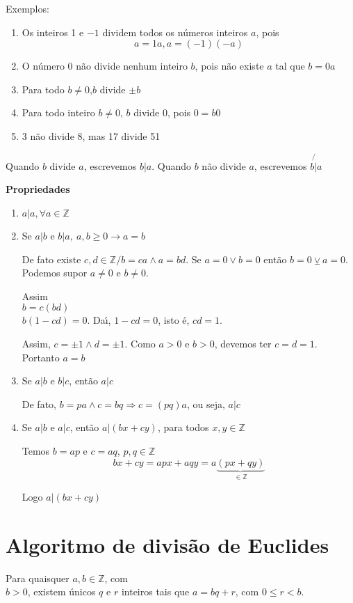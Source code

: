 Exemplos:
\begin{enumerate}
\item Os inteiros 1 e $-1$ dividem todos os n{\'u}meros inteiros $a$, pois \[a=1a,a=(-1)(-a)\]
\item O n{\'u}mero 0 n{\~a}o divide nenhum inteiro $b$, pois n{\~a}o existe $a$ tal que $b=0a$
\item Para todo $b\neq 0$,$b$ divide $\pm b$
\item Para todo inteiro $b\neq 0$, $b$ divide 0, pois $0=b0$
\item 3 n{\~a}o divide 8, mas 17 divide 51
\end{enumerate}

\begin{nota}[Divis{\~a}o] Quando $b$ divide $a$, escrevemos $b|a$. Quando $b$ n{\~a}o divide $a$, escrevemos $b\not{|}a$\end{nota}

\textbf{Propriedades}
\begin{enumerate}
\item $a|a, \forall a\in\mathbb{Z}$
\item Se $a|b$ e $b|a,\ a,b\geq 0\rightarrow a=b$

De fato existe $c,d\in\mathbb{Z}/b=ca\wedge a=bd$. Se $a=0\vee b=0$ ent{\~a}o $b=0\veebar a=0$. Podemos supor $a\neq 0$ e $b\neq 0$.

Assim\\
$b=c(bd)$\\
$b(1-cd)=0$. Da{\'\i}, $1-cd=0$, isto {\'e}, $cd=1$.

Assim, $c=\pm 1\wedge d=\pm 1$. Como $a>0$ e $b>0$, devemos ter $c=d=1$. Portanto $a=b$
\item Se $a|b$ e $b|c$, ent{\~a}o $a|c$

De fato, $b=pa\wedge c=bq \Rightarrow c=(pq)a$, ou seja, $a|c$
\item Se $a|b$ e $a|c$, ent{\~a}o $a|(bx+cy)$, para todos $x,y\in\mathbb{Z}$

Temos $b=ap$ e $c=aq$, $p,q\in\mathbb{Z}$
\[bx+cy=apx+aqy=a\underbrace{(px+qy)}_{\in\mathbb{Z}}\]

Logo $a|(bx+cy)$
\end{enumerate}

\section{Algoritmo de divis{\~a}o de Euclides}

\begin{teorema} Para quaisquer $a,b\in\mathbb{Z}$, com\\ $b>0$, existem {\'u}nicos $q$ e $r$ inteiros tais que $a=bq+r$, com $0\leq r<b$.\end{teorema}

